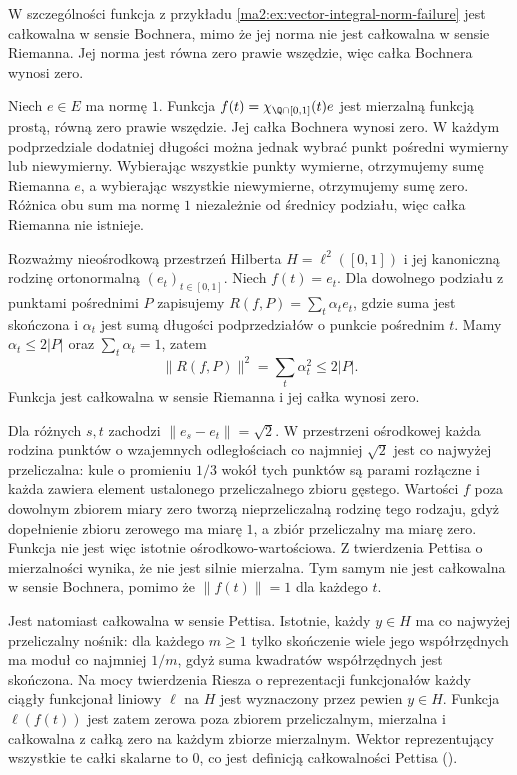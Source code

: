 W szczególności funkcja z przykładu
\ref{ma2:ex:vector-integral-norm-failure}
jest całkowalna w sensie Bochnera, mimo że
jej norma nie jest całkowalna w sensie
Riemanna. Jej norma jest równa zero
prawie wszędzie, więc całka Bochnera
wynosi zero.

\begin{przyklad}
\label{ma2:ex:vector-bochner-not-riemann}
Niech $e\in E$ ma normę $1$.
Funkcja $f(t)=\chi_{\Q\cap[0,1]}(t)e$
jest mierzalną funkcją prostą, równą zero
prawie wszędzie. Jej całka Bochnera wynosi
zero. W każdym podprzedziale dodatniej
długości można jednak wybrać punkt pośredni
wymierny lub niewymierny.
Wybierając wszystkie punkty wymierne,
otrzymujemy sumę Riemanna $e$, a wybierając
wszystkie niewymierne, otrzymujemy sumę zero.
Różnica obu sum ma normę $1$ niezależnie
od średnicy podziału, więc całka Riemanna
nie istnieje.
\end{przyklad}

\begin{przyklad}
\label{ma2:ex:vector-riemann-not-bochner}
Rozważmy nieośrodkową przestrzeń Hilberta
$H=\ell^2([0,1])$ i jej kanoniczną rodzinę
ortonormalną $(e_t)_{t\in[0,1]}$.
Niech $f(t)=e_t$.
Dla dowolnego podziału z punktami
pośrednimi $P$ zapisujemy
$R(f,P)=\sum_t\alpha_te_t$, gdzie suma
jest skończona i $\alpha_t$ jest sumą
długości podprzedziałów o punkcie pośrednim $t$.
Mamy $\alpha_t\le2|P|$ oraz $\sum_t\alpha_t=1$,
zatem
\[
 \|R(f,P)\|^2=\sum_t\alpha_t^2\le2|P|.
\]
Funkcja jest całkowalna w sensie Riemanna
i jej całka wynosi zero.

Dla różnych $s,t$ zachodzi
$\|e_s-e_t\|=\sqrt2$. W przestrzeni ośrodkowej
każda rodzina punktów o wzajemnych odległościach
co najmniej $\sqrt2$ jest co najwyżej przeliczalna:
kule o promieniu $1/3$ wokół tych punktów są
parami rozłączne i każda zawiera element
ustalonego przeliczalnego zbioru gęstego.
Wartości $f$ poza dowolnym zbiorem miary zero
tworzą nieprzeliczalną rodzinę tego rodzaju,
gdyż dopełnienie zbioru zerowego ma miarę $1$,
a zbiór przeliczalny ma miarę zero.
Funkcja nie jest więc istotnie ośrodkowo-wartościowa.
Z twierdzenia Pettisa o mierzalności wynika,
że nie jest silnie mierzalna. Tym samym nie
jest całkowalna w sensie Bochnera, pomimo
że $\|f(t)\|=1$ dla każdego $t$.

Jest natomiast całkowalna w sensie Pettisa.
Istotnie, każdy $y\in H$ ma co najwyżej
przeliczalny nośnik: dla każdego $m\ge1$
tylko skończenie wiele jego współrzędnych
ma moduł co najmniej $1/m$, gdyż suma
kwadratów współrzędnych jest skończona.
Na mocy twierdzenia Riesza o reprezentacji
funkcjonałów każdy ciągły funkcjonał liniowy
$\ell$ na $H$ jest wyznaczony przez pewien
$y\in H$. Funkcja $\ell(f(t))$ jest zatem
zerowa poza zbiorem przeliczalnym, mierzalna
i całkowalna z całką zero na każdym
zbiorze mierzalnym.
Wektor reprezentujący wszystkie te całki
skalarne to $0$, co jest definicją całkowalności
Pettisa ().
\end{przyklad}


